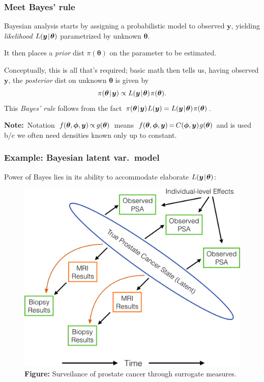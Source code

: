 \documentclass[18pt]{beamer}
\newcommand{\defineTightItemizeSpacing}{%
	\setlength{\abovedisplayskip}{.25\baselineskip}%
	\setlength{\belowdisplayskip}{.25\baselineskip}%
}
\newcommand{\given}{\thinnerspace | \thinnerspace}
\newcommand{\thinnerspace}{\mskip.5\thinmuskip}
\newcommand{\negthinnerspace}{\mskip-.5\thinmuskip}
\newcommand{\density}{\pi}
\newcommand{\likelihood}{L}
\newcommand{\by}{\bm{y}}
\newcommand{\btheta}{\bm{\theta}}
\begin{document}
\begin{frame}
\frametitle{Meet Bayes' rule}

Bayesian analysis starts by assigning a probabilistic model to observed $\by$, yielding \textit{likelihood} $\likelihood(\by \given \btheta)$ parametrized by unknown $\btheta$.

\pause
\smallskip
It then places a \textit{prior} dist $\density(\btheta)$ on the parameter to be estimated.

\pause
\smallskip
Conceptually, this is all that's required; 
basic math then tells us, having observed $\by$, the \textit{posterior} dist on unknown $\btheta$ is given by
\begin{equation*} \defineTightItemizeSpacing%
\density(\btheta \given \by) 
	\propto \likelihood(\by \given \btheta) \thinnerspace \density(\btheta).
\end{equation*}
\pause%
This \textit{Bayes' rule} follows from the fact $\thinnerspace \density(\btheta \given \by) \thinnerspace \likelihood(\by) = \likelihood(\by \given \btheta) \thinnerspace \density(\btheta)$.

\pause
\smallskip
\mbox{\textbf{Note:} Notation $f(\btheta, \bm{\phi}, \by) \negthinnerspace \propto \negthinnerspace g(\btheta)$ means $f(\btheta, \bm{\phi}, \by) \negthinnerspace = \negthinnerspace C(\bm{\phi}, \by) \thinnerspace g(\btheta)$}
and is used b/c we often need densities known only up to constant.

\end{frame}


\begin{frame}
\frametitle{Example: Bayesian latent var.\ model}

Power of Bayes lies in its ability to accommodate elaborate $\likelihood(\by \given \btheta)$:

\pause
\begin{figure}
\centering
\includegraphics[width=.6\linewidth]{Figure/active_surveillence_model_with_mri}

\vspace*{.1\baselineskip}
\caption*{\textcolor{themecolor}{\textbf{Figure:}}
	Surveilance of prostate cancer through surrogate measures.%
}%
\end{figure}

\end{frame}
\end{document}
